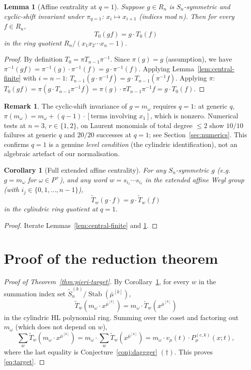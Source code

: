 \documentclass[11pt]{article}
\newtheorem{lemma}[theorem]{Lemma}
\newtheorem{corollary}[theorem]{Corollary}
\theoremstyle{definition}
\newtheorem{remark}[theorem]{Remark}
\newcommand{\bmu}{\bar{\mu}}
\newcommand{\wt}[1]{\widetilde{#1}}
\newcommand{\Sn}{S_n}
\newcommand{\afSn}{\wt{S}_n}
\newcommand{\Stab}{\operatorname{Stab}}
\newcommand{\dgg}{\dagger}
\begin{document}
\begin{lemma}[Affine centrality at $q=1$]\label{lem:central-affine}
Suppose $g \in R_n$ is $\Sn$-symmetric and \emph{cyclic-shift invariant}
under $\pi_{q=1}$: $x_i \mapsto x_{i+1}$ (indices mod $n$). Then for every $f \in R_n$,
\[
T_0(gf) = g \cdot T_0(f)
\]
in the ring quotient $R_n\big/(x_1 x_2 \cdots x_n - 1)$.
\end{lemma}
\begin{proof}
By definition $T_0 = \pi T_{n-1} \pi^{-1}$. Since $\pi(g) = g$ (assumption), we have
$\pi^{-1}(gf) = \pi^{-1}(g)\cdot \pi^{-1}(f) = g \cdot \pi^{-1}(f)$. Applying
Lemma~\ref{lem:central-finite} with $i = n-1$:
$T_{n-1}(g \cdot \pi^{-1} f) = g \cdot T_{n-1}(\pi^{-1} f)$. Applying $\pi$:
$T_0(gf) = \pi(g \cdot T_{n-1}\pi^{-1}f) = \pi(g) \cdot \pi T_{n-1}\pi^{-1}f
= g \cdot T_0(f).$
\end{proof}

\begin{remark}
The cyclic-shift invariance of $g = m_\omega$ requires $q = 1$: at generic $q$,
$\pi(m_\omega) = m_\omega + (q-1) \cdot [\text{terms involving } x_1]$, which is
nonzero. Numerical tests at $n=3$, $r \in \{1,2\}$, on Laurent monomials of
total degree $\le 2$ show $10/10$ failures at generic $q$ and $20/20$
successes at $q=1$; see Section~\ref{sec:numerics}. This confirms
$q = 1$ is a genuine \emph{level condition} (the cylindric identification),
not an algebraic artefact of our normalisation.
\end{remark}

\begin{corollary}[Full extended affine centrality]\label{cor:central-full}
For any $\Sn$-symmetric $g$ (e.g.\ $g = m_\omega$ for $\omega \in P^+$),
and any word $w = s_{i_1}\cdots s_{i_\ell}$ in the extended affine Weyl
group (with $i_j \in \{0, 1, \ldots, n-1\}$),
\[
\wt T_w(g \cdot f) = g \cdot \wt T_w(f)
\]
in the cylindric ring quotient at $q=1$.
\end{corollary}
\begin{proof}
Iterate Lemmas~\ref{lem:central-finite} and \ref{lem:central-affine}.
\end{proof}

\section{Proof of the reduction theorem}
\label{sec:reduction}

\begin{proof}[Proof of Theorem~\ref{thm:pieri-target}]
By Corollary~\ref{cor:central-full}, for every $w$ in the summation index set
$\afSn^{(k)}/\Stab(\bmu^{[k]})$,
\[
\wt T_w(m_\omega \cdot x^{\bmu^{[k]}}) = m_\omega \cdot \wt T_w(x^{\bmu^{[k]}})
\]
in the cylindric HL polynomial ring. Summing over the coset and factoring
out $m_\omega$ (which does not depend on $w$),
\[
\sum_w \wt T_w(m_\omega \cdot x^{\bmu^{[k]}})
= m_\omega \cdot \sum_w \wt T_w(x^{\bmu^{[k]}})
= m_\omega \cdot v_\mu(t) \cdot P^{(c,k)}_\mu(x;t),
\]
where the last equality is Conjecture~\ref{conj:daggger} $(\dgg)$.
This proves \eqref{eq:target}.
\end{proof}
\end{document}
